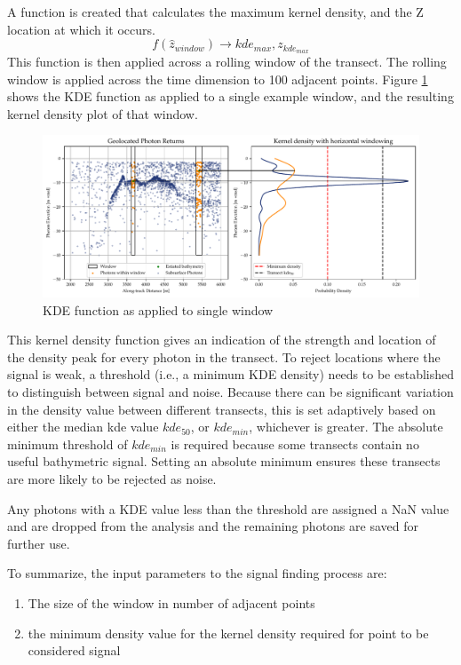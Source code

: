 A function is created that calculates the maximum kernel density, and the Z location at which it occurs. $$ f(\hat{z}_{window}) \rightarrow kde_{max},z_{kde_{max}} $$ This function is then applied across a rolling window of the transect. The rolling window is applied across the time dimension to 100 adjacent points. Figure \ref{fig:kdefunc} shows the KDE function as applied to a single example window, and the resulting kernel density plot of that window.

\begin{figure}[htbp]
    \centering
    \includegraphics[width=\textwidth]{figures/2d_kde_plot.pdf}
    \caption{KDE function as applied to single window}
    \label{fig:kdefunc}
\end{figure}

This kernel density function gives an indication of the strength and location of the density peak for every photon in the transect. To reject locations where the signal is weak, a threshold (i.e., a minimum KDE density) needs to be established to distinguish between signal and noise. Because there can be significant variation in the density value between different transects, this is set adaptively based on either the median kde value $kde_{50}$, or $kde_{min}$, whichever is greater. The absolute minimum threshold of $kde_{min}$ is required because some transects contain no useful bathymetric signal. Setting an absolute minimum ensures these transects are more likely to be rejected as noise. 

Any photons with a KDE value less than the threshold are assigned a NaN value and are dropped from the analysis and the remaining photons are saved for further use.

To summarize, the input parameters to the signal finding process are:

\begin{enumerate}
    \item The size of the window in number of adjacent points
    \item the minimum density value for the kernel density required for point to be considered signal
\end{enumerate}

